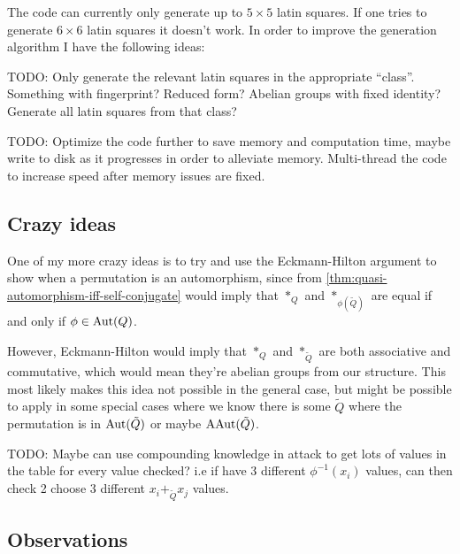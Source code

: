 \begin{idea}
    The code can currently only generate up to \( 5 \times 5 \) latin squares. If one tries to generate \( 6 \times 6 \) latin squares it doesn't work. In order to improve the generation algorithm I have the following ideas:

    TODO: Only generate the relevant latin squares in the appropriate ``class''. Something with fingerprint? Reduced form? Abelian groups with fixed identity? Generate all latin squares from that class?

    TODO: Optimize the code further to save memory and computation time, maybe write to disk as it progresses in order to alleviate memory. Multi-thread the code to increase speed after memory issues are fixed.
\end{idea}

\subsection{Crazy ideas}

\begin{idea}
    One of my more crazy ideas is to try and use the Eckmann-Hilton argument to show when a permutation is an automorphism, since from \autoref{thm:quasi-automorphism-iff-self-conjugate} would imply that \( *_Q \) and \( *_{\phi(\tilde{Q})} \) are equal if and only if \( \phi \in \operatorname{Aut}(Q) \). 
    
    However, Eckmann-Hilton would imply that \( *_Q \) and \( *_{\tilde{Q}} \) are both associative and commutative, which would mean they're abelian groups from our structure. This most likely makes this idea not possible in the general case, but might be possible to apply in some special cases where we know there is some \( \tilde{Q} \) where the permutation is in \( \operatorname{Aut}(\tilde{Q}) \) or maybe \( \operatorname{AAut}(\tilde{Q}) \).
\end{idea}

\begin{idea}
    TODO: Maybe can use compounding knowledge in attack to get lots of values in the table for every value checked? i.e if have 3 different \( \phi^{-1}(x_i) \) values, can then check 2 choose 3 different \( x_i +_{\tilde{Q}} x_j  \) values.
\end{idea}

\subsection{Observations}

